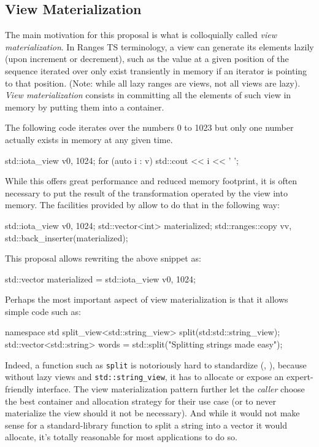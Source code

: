 \documentclass{wg21}
\newcommand{\cc}[1]{\texttt{#1}}
\begin{document}
\subsection{View Materialization}

The main motivation for this proposal is what is colloquially called \emph{view materialization}.
In Ranges TS terminology, a view can generate its elements lazily (upon increment or decrement), such as the value at a given position of the sequence
iterated over only exist transiently in memory if an iterator is pointing to that position.
(Note: while all lazy ranges are views, not all views are lazy).\\

\emph{View materialization} consists in committing all the elements of such view in memory by putting them into a container.

The following code iterates over the numbers 0 to 1023 but only one number actually exists in memory at any given time.
\begin{codeblock}
std::iota_view v{0, 1024};
for (auto i : v) {
    std::cout << i << ' ';
}
\end{codeblock}

While this offers great performance and reduced memory footprint, it is often necessary to put the result of the transformation operated by the view into memory.
The facilities provided by \cite{P0896R3} allow to do that in the following way:


\begin{codeblock}
    std::iota_view v{0, 1024};
    std::vector<int> materialized;
    std::ranges::copy v{v, std::back_inserter(materialized)};
\end{codeblock}

This proposal allows rewriting the above snippet as:

\begin{codeblock}
    std::vector materialized = std::iota_view v{0, 1024};
\end{codeblock}


Perhaps the most important aspect of view materialization is that it allows simple code such as:

\begin{codeblock}
    namespace std {
        split_view<std::string_view> split(std:std::string_view);
    }
    std::vector<std::string> words = std::split("Splitting strings made easy");
\end{codeblock}

Indeed, a function such as \cc{split} is notoriously hard to standardize (\cite{P0540},  \cite{N3593}), because without lazy views and \cc{std::string_view}, it has to allocate or expose an expert-friendly interface.
The view materialization pattern further let the \emph{caller} choose the best container and allocation strategy for their use case (or to never materialize the view should it not be necessary).
And while it would not make sense for a standard-library function to split a string into a vector it would allocate, it's totally reasonable for most applications to do so.\\
\end{document}
